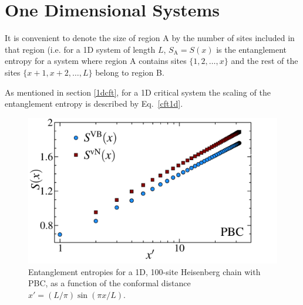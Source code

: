\section{One Dimensional Systems}


It is convenient to denote the size of region A by the number of sites included in that region 
(i.e. for a 1D system of length $L$, $S_{\text{A}} = S(x)$ is the entanglement entropy for a system where region A contains sites $\{1,2,\dots,x\}$ and the rest of the sites $\{x+1,x+2,\dots,L\}$
belong to region B.

As mentioned in section \ref{1dcft}, for a 1D critical system the scaling of the entanglement entropy is described by Eq.~\eqref{cft1d}. 

\begin{figure} {
\includegraphics[width=5.5in]{./figures/paper1/figure1/thesis_pbc.pdf} 
\centering
\caption[1D PBC Results for \vb with \vN]{
Entanglement entropies for a 1D, 100-site Heisenberg chain with PBC, as a function of the conformal distance $x'  = (L/\pi)\sin (\pi x/L)$.
\label{1dPBC}}
} 
\end{figure}

